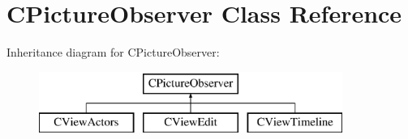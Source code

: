\hypertarget{class_c_picture_observer}{}\section{C\+Picture\+Observer Class Reference}
\label{class_c_picture_observer}
Inheritance diagram for C\+Picture\+Observer\+:\begin{figure}[H]
\begin{center}
\leavevmode
\includegraphics[height=2.000000cm]{class_c_picture_observer}
\end{center}
\end{figure}
